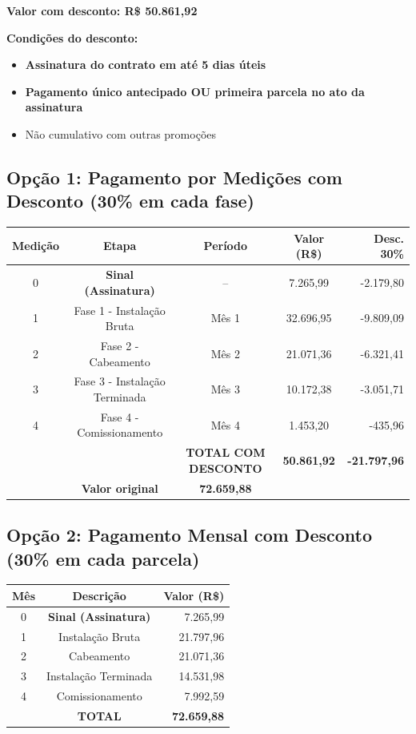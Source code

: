 \documentclass[12pt,a4paper]{article}
\renewenvironment{table}%
{\begin{center}%
\scriptsize%
\addtolength{\tabcolsep}{-2pt}%
}%
{\end{center}}
\begin{document}
\noindent\textbf{Valor com desconto: R\$ 50.861,92}

\noindent\textbf{Condições do desconto:}
\begin{itemize}
\item \textbf{Assinatura do contrato em até 5 dias úteis}
\item \textbf{Pagamento único antecipado OU primeira parcela no ato da assinatura}
\item Não cumulativo com outras promoções
\end{itemize}

\subsection{Opção 1: Pagamento por Medições com Desconto (30\% em cada fase)}

\begin{table}
\centering
\begin{tabular}{ccccr}
\toprule
\textbf{Medição} & \textbf{Etapa} & \textbf{Período} & \textbf{Valor (R\$)} & \textbf{Desc. 30\%} \\
\midrule
0 & \textbf{Sinal (Assinatura)} & -- & 7.265,99 & -2.179,80 \\
1 & Fase 1 - Instalação Bruta & Mês 1 & 32.696,95 & -9.809,09 \\
2 & Fase 2 - Cabeamento & Mês 2 & 21.071,36 & -6.321,41 \\
3 & Fase 3 - Instalação Terminada & Mês 3 & 10.172,38 & -3.051,71 \\
4 & Fase 4 - Comissionamento & Mês 4 & 1.453,20 & -435,96 \\
\midrule
 & & \textbf{TOTAL COM DESCONTO} & \textbf{50.861,92} & \textbf{-21.797,96} \\
 & \textbf{Valor original} & \textbf{72.659,88} & & \\
\bottomrule
\end{tabular}
\end{table}

\subsection{Opção 2: Pagamento Mensal com Desconto (30\% em cada parcela)}

\begin{table}
\centering
\begin{tabular}{ccr}
\toprule
\textbf{Mês} & \textbf{Descrição} & \textbf{Valor (R\$)} \\
\midrule
0 & \textbf{Sinal (Assinatura)} & 7.265,99 \\
1 & Instalação Bruta & 21.797,96 \\
2 & Cabeamento & 21.071,36 \\
3 & Instalação Terminada & 14.531,98 \\
4 & Comissionamento & 7.992,59 \\
\midrule
 & \textbf{TOTAL} & \textbf{72.659,88} \\
\bottomrule
\end{tabular}
\end{table}
\end{document}
